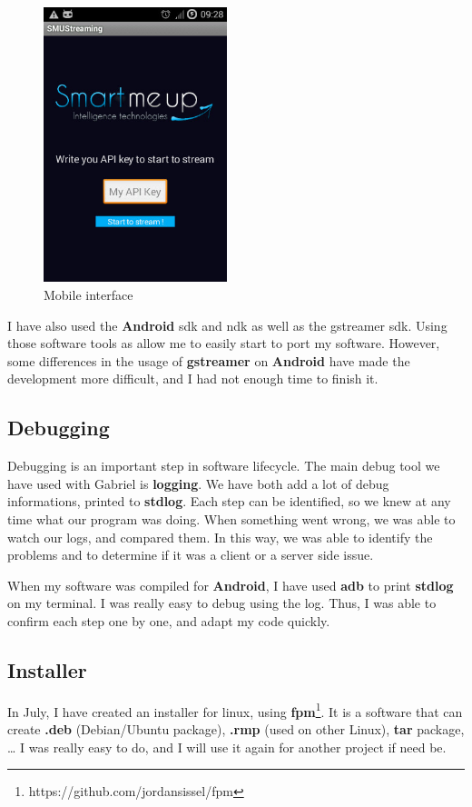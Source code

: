 \documentclass[a4paper,11pt]{custom}
\newcommand{\gstreamer}{\textbf{gstreamer}\xspace}
\newcommand{\fpm}{\textbf{fpm}\xspace}
\newcommand{\android}{\textbf{Android}\xspace}
\begin{document}
\begin{figure}
\centering
\includegraphics[height=8cm]{smu_mobile.jpg}
\caption{Mobile interface}
\label{fig:smumobile}
\end{figure}

I have also used the \android{} sdk and ndk as well as the gstreamer sdk. Using
those software tools as allow me to easily start to port my software. However,
some differences in the usage of \gstreamer{} on \android{} have made the
development more difficult, and I had not enough time to finish it.

\subsection{Debugging}

Debugging is an important step in software lifecycle. The main debug tool we have
used with Gabriel is \textbf{logging}. We have both add a lot of debug
informations, printed to \textbf{stdlog}. Each step can be identified, so we knew
at any time what our program was doing. When something went wrong, we was able
to watch our logs, and compared them. In this way, we was able to identify
the problems and to determine if it was a client or a server side issue.

When my software was compiled for \android, I have used \textbf{adb} to print
\textbf{stdlog} on my terminal. I was really easy to debug using the log. Thus,
I was able to confirm each step one by one, and adapt my code quickly.

\subsection{Installer}

In July, I have created an installer for linux, using
\fpm{}\footnote{https://github.com/jordansissel/fpm}. It is a software that can
create \textbf{.deb} (Debian/Ubuntu package), \textbf{.rmp} (used on other
Linux), \textbf{tar} package, … I was really easy to do, and I will use it again
for another project if need be.
\end{document}
